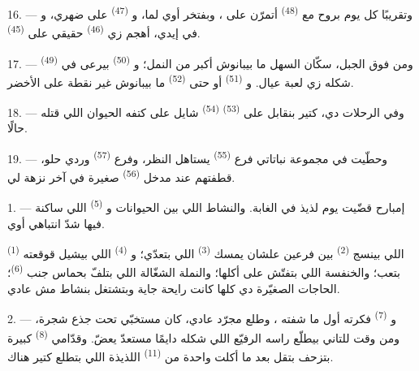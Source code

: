 \VUsaut{3.0mm}

16. --- وتقريبًا كل يوم بروح مع  \textsuperscript{(48)} أتمرّن على
، وبفتخر أوي لما، و \textsuperscript{(47)} على ضهري،
و في إيدي، أهجم زي  \textsuperscript{(46)} حقيقي
على  \textsuperscript{(45)}.

17. --- ومن فوق الجبل، سكّان السهل ما بيبانوش أكبر من النمل؛
و \textsuperscript{(50)} بيرعى في  \textsuperscript{(49)}
شكله زي لعبة عيال. و \textsuperscript{(51)} أو حتى 
\textsuperscript{(52)} ما بيبانوش غير نقطة على الأخضر.

18. --- وفي الرحلات دي، كتير بنقابل على  \textsuperscript{(53)}
 \textsuperscript{(54)} شايل على كتفه الحيوان اللي قتله حالًا.

19. --- وحطّيت في مجموعة نباتاتي فرع  \textsuperscript{(55)} يستاهل
النظر، وفرع  \textsuperscript{(57)} وردي حلو، قطفتهم عند مدخل
 \textsuperscript{(56)} صغيرة في آخر نزهة لي.

\VUsaut{3.0mm}
\VUsaut{3.0mm}

\VUsaut{3.0mm}

1. --- إمبارح قضّيت يوم لذيذ في الغابة. والنشاط اللي بين الحيوانات
و \textsuperscript{(5)} اللي ساكنة فيها شدّ انتباهي أوي.

 \textsuperscript{(1)} اللي بينسج  \textsuperscript{(2)} بين
فرعين علشان يمسك  \textsuperscript{(3)} اللي بتعدّي؛
و \textsuperscript{(4)} اللي بيشيل قوقعته بتعب؛ والخنفسة اللي بتفتّش
على أكلها؛ والنملة الشغّالة اللي بتلفّ بحماس جنب 
\textsuperscript{(6)}؛ الحاجات الصغيّرة دي كلها كانت رايحة جاية وبتشتغل بنشاط مش
عادي.

2. --- و \textsuperscript{(7)} فكرته أول ما شفته ، وطلع
مجرّد  عادي، كان مستخبّي تحت جذع شجرة، ومن وقت للتاني بيطلّع راسه
الرفيّع اللي شكله دايمًا مستعدّ يعضّ. وقدّامي  \textsuperscript{(8)}
كبيرة بتزحف بتقل بعد ما أكلت واحدة من  \textsuperscript{(11)} اللذيذة
اللي بتطلع كتير هناك.

